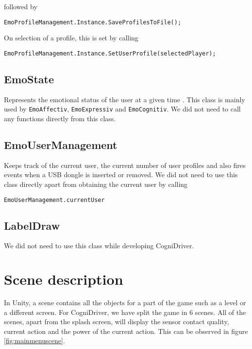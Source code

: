 followed by

\begin{Verbatim}[frame=single, framesep=3mm]
EmoProfileManagement.Instance.SaveProfilesToFile();
\end{Verbatim}

On selection of a profile, this is set by calling

\begin{Verbatim}[frame=single, framesep=3mm]
EmoProfileManagement.Instance.SetUserProfile(selectedPlayer);
\end{Verbatim}

\subsection{EmoState}
Represents the emotional status of the user at a given time \cite{emotivSDKUserManual}. This class is mainly used by \texttt{EmoAffectiv}, \texttt{EmoExpressiv} and \texttt{EmoCognitiv}. We did not need to call any functions directly from this class.

\subsection{EmoUserManagement}
Keeps track of the current user, the current number of user profiles and also fires events when a USB dongle is inserted or removed. We did not need to use this class directly apart from obtaining the current user by calling

\begin{Verbatim}[frame=single, framesep=3mm]
EmoUserManagement.currentUser
\end{Verbatim}

\subsection{LabelDraw}
We did not need to use this class while developing CogniDriver.

\section{Scene description}
In Unity, a scene contains all the objects for a part of the game such as a level or a different screen. For CogniDriver, we have split the game in 6 scenes. All of the scenes, apart from the splash screen, will display the sensor contact quality, current action and the power of the current action. This can be observed in figure \ref{fig:mainmenuscene}.


